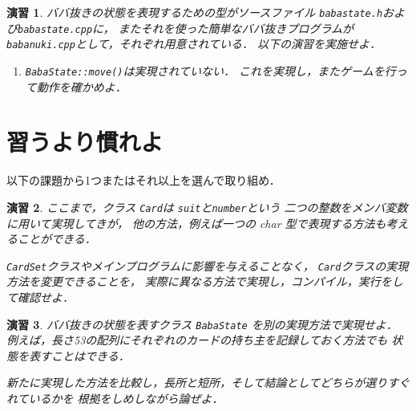 \documentclass[11pt,a4,epsf]{jarticle}
\newtheorem{exerc}{演習}
\begin{document}
\begin{exerc} %
ババ抜きの状態を表現するための型がソースファイル
\verb+babastate.h+および\verb+babastate.cpp+に，
またそれを使った簡単なババ抜きプログラムが
\verb+babanuki.cpp+として，それぞれ用意されている．
以下の演習を実施せよ．

\begin{enumerate}

\item[(1)] \verb+BabaState::move()+は実現されていない．
これを実現し，またゲームを行って動作を確かめよ．

\end{enumerate}

\end{exerc} %

\section{習うより慣れよ}

以下の課題から1つまたはそれ以上を選んで取り組め．

\begin{exerc} %
ここまで，クラス \verb+Card+は \verb+suit+と\verb+number+という
二つの整数をメンバ変数に用いて実現してきが，
他の方法，例えば一つの char 型で表現する方法も考えることができる．

\verb+CardSet+クラスやメインプログラムに影響を与えることなく，
\verb+Card+クラスの実現方法を変更できることを，
実際に異なる方法で実現し，コンパイル，実行をして確認せよ．
\end{exerc} %

\begin{exerc} %
ババ抜きの状態を表すクラス \verb+BabaState+ を別の実現方法で実現せよ．
例えば，長さ53の配列にそれぞれのカードの持ち主を記録しておく方法でも
状態を表すことはできる．

新たに実現した方法を比較し，長所と短所，そして結論としてどちらが選りすぐれているかを
根拠をしめしながら論ぜよ．
\end{exerc} %

%
\end{document}

